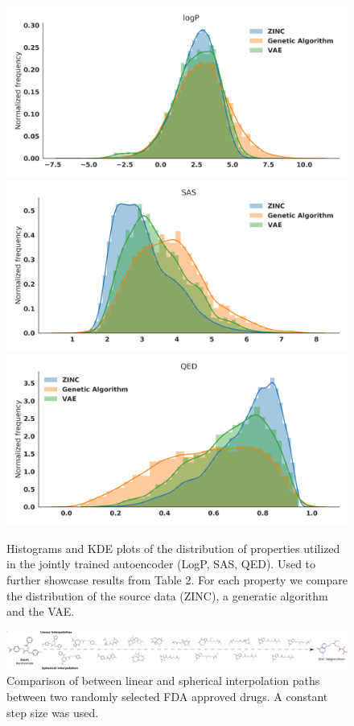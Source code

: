 \begin{figure}
\centering
\includegraphics[width=0.3\columnwidth]{./logP.png}
\includegraphics[width=0.3\columnwidth]{./SAS.png}
\includegraphics[width=0.3\columnwidth]{./QED.png}

\caption[KDE plots for distribution of logP, SAS, and QED properties]{
Histograms and KDE plots of the distribution of properties utilized in the jointly trained autoencoder (LogP, SAS, QED). Used to further showcase results from Table 2. For each property we compare the distribution of the source data (ZINC), a generatic algorithm and the VAE.}
\label{fig:prop_dists}
\end{figure}


\begin{figure}
\centering
\includegraphics[width=\columnwidth]{./Slerp-lerp_compare.png}
\caption[Comparison of Interpolation Methods]{Comparison of between linear and spherical interpolation paths between two randomly selected FDA approved drugs. A constant step size was used.}
\label{fig:interpol_1}
\end{figure}


